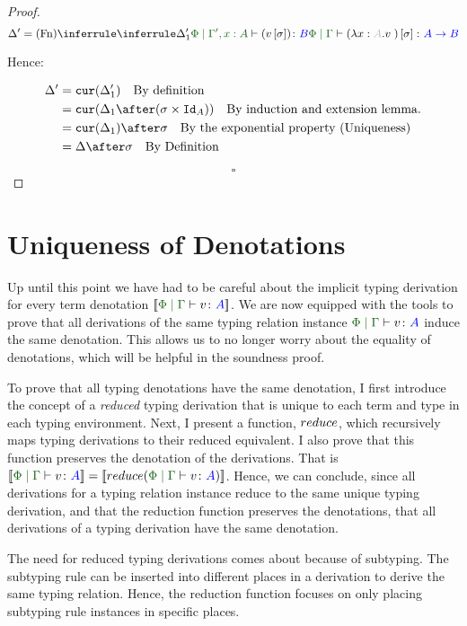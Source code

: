\documentclass{Report}
\begin{document}
\begin{proof}
\begin{equation}\label{TermSubLambdaPrime}
    \D' = \ntreeruleI{Fn}{
        \treeruleI{\D_1'}{\etyperelation{\P}{\G', x:A}{(v\ssi)}{B}}
    }{\etyperelation{\P}{\G}{(\lam{x}{A}{v})\ssi}{\ab}}
\end{equation}


Hence:

\begin{align*}
    \D' &= \cur{\D_1'}\qt{By definition}\\
        &= \cur{\D_1\after(\si\times\Id{A})}\qt{By induction and extension lemma.}\\
        & = \cur{\D_1}\after\si\qt{By the exponential property (Uniqueness)}\\
        &= \D\after\si\qt{By Definition}\\
\end{align*}

$$\square$$
\end{proof}


\section{Uniqueness of Denotations}

Up until this point we have had to be careful about the implicit typing derivation for every term denotation $\deno{\gpetyperelation{v}{A}}$. We are now equipped with the tools to prove that all derivations of the same typing relation instance $\gpetyperelation{v}{A}$ induce the same denotation. This allows us to no longer worry about the equality of denotations, which will be helpful in the soundness proof.

To prove that all typing denotations have the same denotation, I first introduce the concept of a \textit{reduced} typing derivation that is unique to each term and type in each typing environment. Next, I present a function, $reduce$, which recursively maps  typing derivations to their reduced equivalent. I also prove that this function preserves the denotation of the derivations. That is $\deno{\gpetyperelation{v}{A}} = \deno{\reduce(\gpetyperelation{v}{A})}$. Hence, we can conclude, since all derivations for a typing relation instance reduce to the same unique typing derivation, and that the reduction function preserves the denotations, that all derivations of a typing derivation have the same denotation.

The need for reduced typing derivations comes about because of subtyping. The subtyping rule can be inserted into different places in a derivation to derive the same typing relation. Hence, the reduction function focuses on only placing subtyping rule instances in specific places. 
\end{document}
